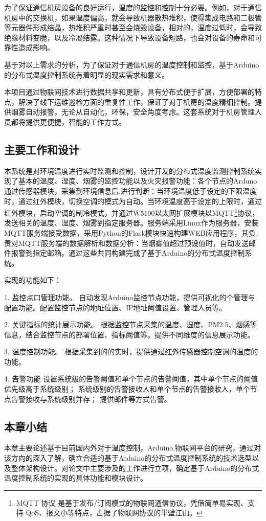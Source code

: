 为了保证通信机房设备的良好运行，温度的监控和控制十分必要。例如，对于通信机房中的交换机，如果温度偏高，就会导致机器散热堆积，使得集成电路和二极管等元器件形成结晶，热堆积严重时甚至会烧毁设备，相对的，温度过低时，会导致绝缘材料变脆，以及冷凝结露。这种情况下导致设备短路，也会对设备的寿命和可靠性造成影响。

基于对以上需求的分析，为了保证对于通信机房的温度控制和监控，基于Arduino的分布式温度控制系统有着明显的现实需求和意义。

本项目通过物联网技术进行数据共享和更新，具有分布式便于扩展，方便部署的特点，解决了线下运维巡检方面的重复性工作，保证了对于机房的温度精细控制。提供烟雾自动报警，无论从自动化，环保，安全角度考虑。这套系统对于机房管理人员都将提供更便捷，智能的工作方式。


\subsection{主要工作和设计}

本系统是对环境温度进行实时监测和控制，设计开发的分布式温度监测控制系统实现了基本的温度、湿度、烟雾的监控功能以及火灾报警功能：各个节点的Arduno通过传感器模块，采集到环境信息后,进行判断：当环境温度低于设定的下限温度时，通过红外模块，切换空调的模式为自动。当环境温度高于设定的上限时，通过红外模块，启动空调的制冷模式，并通过W5100以太网扩展模块以MQTT\footnote{MQTT 协议 是基于发布/订阅模式的物联网通信协议，凭借简单易实现、支持 QoS、报文小等特点，占据了物联网协议的半壁江山。}协议，发送相关的温度、湿度、烟雾到指定服务器。服务端采用Linux作为服务器，安装MQTT服务端接受数据，采用Python的Flask模块快速构建WEB应用程序，其负责对MQTT服务端的数据解析和数据分析：当烟雾值超过预设值时，自动发送邮件报警到指定邮箱。通过这些共同构建完成了基于Arduino的分布式温度控制系统。

\newpage 
实现的功能如下：

1. 监控点口管理功能。 自动发现Arduino监控节点功能，提供可视化的个管理与配置功能。配置监控节点的地址位置、IP地址阈值设置、管理人员等。

2. 关键指标的统计展示功能。 根据监控节点采集的温度、湿度、PM2.5、烟感等信息，结合监控节点的部署位置、指标阈值等。提供不同维度的信息展示功能。 

3. 温度控制功能。 根据采集到的的实时，提供通过红外传感器控制空调的温度的功能。 

4. 告警功能 设置系统级的告警阈值和单个节点的告警阈值，其中单个节点的阈值优先级高于系统级别； 系统级别的告警接收人和单个节点的告警接收人，单个节点告警接收与系统级别并存； 提供邮件等方式告警。

\subsection{本章小结}
本章主要论述基于目前国内外对于温度控制，Arduino,物联网平台的研究，通过对该方向的深入了解，确立合适的基于Arduino的分布式温度控制系统的技术选型以及整体架构设计。对论文中主要涉及的工作进行立项，确定基于Arduino的分布式温度控制系统的实现的具体功能和模块设计。